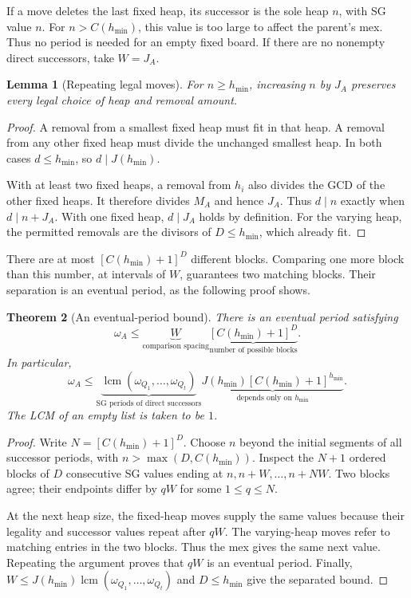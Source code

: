 \documentclass[10pt,a4paper]{article}
\newtheorem{theorem}{Theorem}[section]
\newtheorem{lemma}[theorem]{Lemma}
\begin{document}
If a move deletes the last fixed heap, its successor is the sole
heap $n$, with SG value $n$. For $n>C(h_{\min})$, this value is
too large to affect the parent's mex. Thus no period is needed
for an empty fixed board. If there are no nonempty direct
successors, take $W=J_A$.

\begin{lemma}[Repeating legal moves]
\label{lem:legality}
For $n\ge h_{\min}$, increasing $n$ by $J_A$ preserves every
legal choice of heap and removal amount.
\end{lemma}
\begin{proof}
A removal from a smallest fixed heap must fit in that heap.
A removal from any other fixed heap must divide the unchanged
smallest heap. In both cases $d\le h_{\min}$, so
$d\mid J(h_{\min})$.

With at least two fixed heaps, a removal from $h_i$ also divides
the GCD of the other fixed heaps. It therefore divides $M_A$
and hence $J_A$. Thus $d\mid n$ exactly when $d\mid n+J_A$.
With one fixed heap, $d\mid J_A$ holds by definition.
For the varying heap, the permitted removals are the divisors
of $D\le h_{\min}$, which already fit.
\end{proof}

There are at most $[C(h_{\min})+1]^D$ different blocks.
Comparing one more block than this number, at intervals of
$W$, guarantees two matching blocks. Their separation is an
eventual period, as the following proof shows.


\begin{theorem}[An eventual-period bound]
\label{thm:period}
There is an eventual period satisfying
\begin{equation}
 \boxed{\omega_A\le
 \underbrace{W}_{\text{comparison spacing}}
 \underbrace{[C(h_{\min})+1]^D}_{\text{number of possible blocks}}.}
 \label{eq:periodfine}
\end{equation}
In particular,
\begin{equation}
 \boxed{\omega_A\le
 \underbrace{\operatorname{lcm}(\omega_{Q_1},\ldots,\omega_{Q_t})}_{
 \text{SG periods of direct successors}}
 \underbrace{J(h_{\min})[C(h_{\min})+1]^{h_{\min}}}_{
 \text{depends only on }h_{\min}}.}
 \label{eq:periodseparated}
\end{equation}
The LCM of an empty list is taken to be $1$.
\end{theorem}

\begin{proof}
Write $N=[C(h_{\min})+1]^D$. Choose $n$ beyond the initial
segments of all successor periods, with $n>\max(D,C(h_{\min}))$.
Inspect the $N+1$ ordered blocks of $D$ consecutive SG values
ending at $n,n+W,\ldots,n+NW$. Two blocks agree; their endpoints
differ by $qW$ for some $1\le q\le N$.

At the next heap size, the fixed-heap moves supply the same values
because their legality and successor values repeat after $qW$.
The varying-heap moves refer to matching entries in the two blocks.
Thus the mex gives the same next value. Repeating the argument
proves that $qW$ is an eventual period. Finally,
$W\le J(h_{\min})\operatorname{lcm}(\omega_{Q_1},\ldots,\omega_{Q_t})$
and $D\le h_{\min}$ give the separated bound.
\end{proof}
\end{document}
